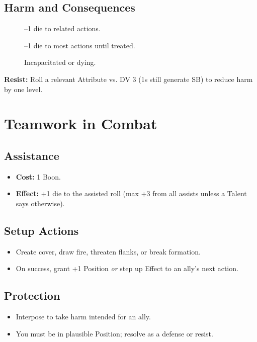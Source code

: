 \subsection{Harm and Consequences}\label{subsec:harm_consequences}
\begin{description}
    \item[] --1 die to related actions.
    \item[] --1 die to most actions until treated.
    \item[] Incapacitated or dying.
\end{description}
\textbf{Resist:} Roll a relevant Attribute vs. DV 3 (1s still generate SB) to reduce harm by one level.

\section{Teamwork in Combat}\label{sec:teamwork}

\subsection{Assistance}\label{subsec:assistance}
\begin{itemize}
    \item \textbf{Cost:} 1 Boon.
    \item \textbf{Effect:} +1 die to the assisted roll (max +3 from all assists unless a Talent says otherwise).
\end{itemize}

\subsection{Setup Actions}\label{subsec:setup_actions}
\begin{itemize}
    \item Create cover, draw fire, threaten flanks, or break formation.
    \item On success, grant +1 Position \emph{or} step up Effect to an ally's next action.
\end{itemize}

\subsection{Protection}\label{subsec:protection}
\begin{itemize}
    \item Interpose to take harm intended for an ally.
    \item You must be in plausible Position; resolve as a defense or resist.
\end{itemize}

